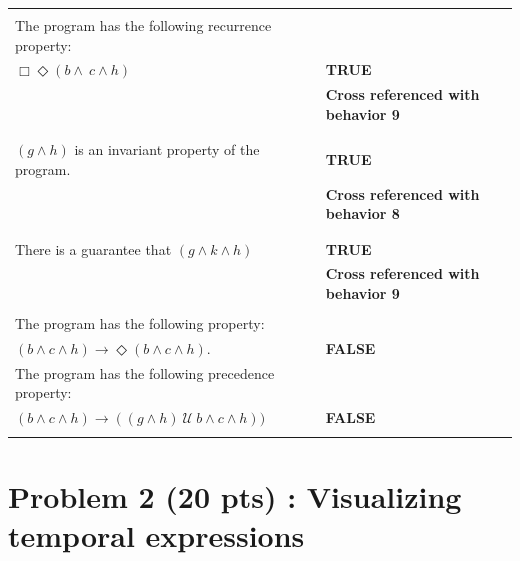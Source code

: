 \documentclass[12pt]{article}
\begin{document}
\begin{enumerate}
\begin{table}
\begin{tabular}{|l|l|}
&\\
		
The program has the following recurrence property: &\\
$\Box \Diamond (b \wedge \ c \wedge h)$		
 &\textbf{TRUE}\\
 &\textbf{Cross referenced with behavior 9}\\
&\\

\hline

&\\
		
$( g \wedge h)$ is an invariant property of the program.  
 &\textbf{TRUE}\\
 &\textbf{Cross referenced with behavior 8}\\
&\\

\hline

&\\
		
There is a guarantee that $(g \wedge k \wedge h)$	
 &\textbf{TRUE}\\
 &\textbf{Cross referenced with behavior 9}\\
&\\

\hline

	
The program has the following property: &\\
$(b \wedge c \wedge h) \rightarrow \Diamond (b \wedge c \wedge h)$.   
 &\textbf{FALSE}\\


\hline

		
The program has the following precedence property: &\\
$(b \wedge c \wedge h) \rightarrow ( (g \wedge h) ~\mathcal{U}~ b \wedge c \wedge h))$
	 &\textbf{FALSE}\\	
&\\

\hline

\end{tabular}
\end{table}


\end{enumerate}


\newpage

\section*{Problem 2 (20 pts) :  Visualizing temporal expressions}
\end{document}
